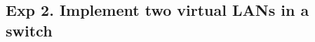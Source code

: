 \documentclass[compilation.tex]{subfiles}
\begin{document}

\subsection[Implement two virtual LANs in a switch]{Exp 2. Implement two virtual LANs in a switch}
\label{exp:2}
\end{document}
